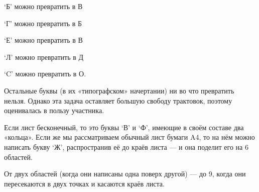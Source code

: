 \begin{itemize}

\def\ltr#1{`#1'}

\itA \ltr Б можно превратить в В\scolon

\ltr Г можно превратить в Б\scolon

\ltr Е можно превратить в В\scolon

\ltr Л можно превратить в Д\scolon

\ltr C можно превратить в О.

Остальные буквы (в их «типографском» начертании) ни во что превратить нельзя. Однако эта задача оставляет большую свободу трактовок, поэтому оценивалась в пользу участника.

\itB Если лист бесконечный, то это буквы \ltr В и \ltr Ф, имеющие в своём составе два «кольца». Если же мы рассматриваем обычный лист бумаги A4, то на нём можно написать букву \ltr Ж, распространив её до краёв листа — и она поделит его на 6 областей.

\itC От двух областей (когда они написаны одна поверх другой) — до 9, когда они пересекаются в двух точках и касаются краёв листа.
\end{itemize}